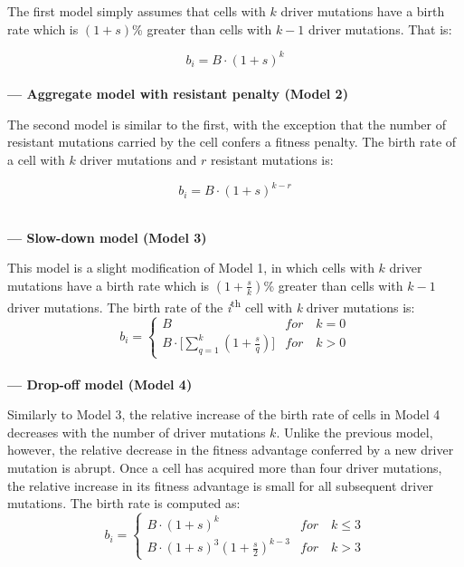 \documentclass[12pt]{article}
\begin{document}
The first model simply assumes that cells with $k$ driver mutations have a birth rate which is $(1+s)$\% greater than cells with $k-1$ driver mutations. That is:

\begin{equation*}
b_{i} = B\cdot(1+s)^{k}
\end{equation*}\\

\indent \textbf{--- Aggregate model with resistant penalty (Model 2)}

The second model is similar to the first, with the exception that the number of resistant mutations carried by the cell confers a fitness penalty. The birth rate of a cell with $k$ driver mutations and $r$ resistant mutations is:

\begin{equation*}
b_{i} = B\cdot(1+s)^{k-r}
\end{equation*}\\

\clearpage

\indent \textbf{--- Slow-down model (Model 3)}

This model is a slight modification of Model 1, in which cells with $k$ driver mutations have a birth rate which is $(1+\frac{s}{k})$\% greater than cells with $k-1$ driver mutations. The birth rate of the \textit{i}\textsuperscript{th} cell with \textit{k} driver mutations is:\\

\[
 b_{i} = 
 \begin{cases} 
      B & for \quad k = 0 \\
      B\cdot \big[ \sum^{k}_{q=1} (1+\frac{s}{q}) \big] & for \quad k > 0
   \end{cases}
\]\\

\indent \textbf{--- Drop-off model (Model 4)}

Similarly to Model 3, the relative increase of the birth rate of cells in Model 4 decreases with the number of driver mutations $k$. Unlike the previous model, however, the relative decrease in the fitness advantage conferred by a new driver mutation is abrupt. Once a cell has acquired more than four driver mutations, the relative increase in its fitness advantage is small for all subsequent driver mutations. The birth rate is computed as:\\

\[
 b_{i} = 
 \begin{cases} 
      B\cdot(1+s)^{k}& for \quad k \leq 3 \\
      B\cdot(1+s)^{3}(1+\frac{s}{2})^{k-3}& for \quad k > 3
   \end{cases}
\]\\
\end{document}
